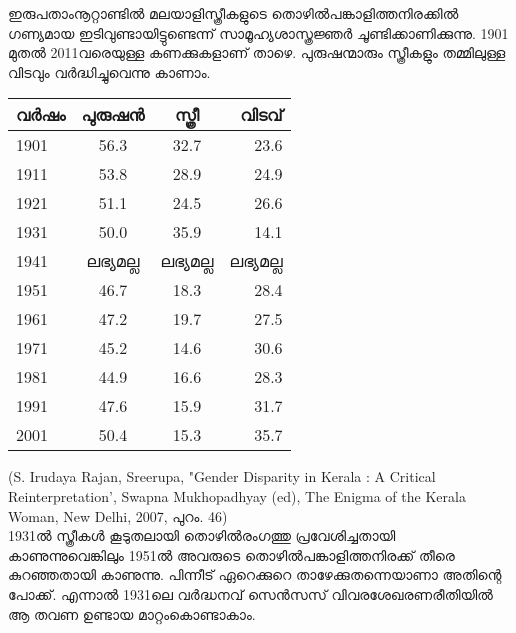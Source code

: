 \label{ch4box1} %
\begin{tcolorbox}[%
 breakable, %
  arc=0mm, 
  left=1pt, right = 1pt, 
  boxrule=0mm,
  colback = {blue!10}, %
] 
ഇരുപതാംനൂറ്റാണ്ടിൽ മലയാളിസ്ത്രീകളുടെ തൊഴിൽപങ്കാളിത്തനിരക്കിൽ ഗണ്യമായ ഇടിവുണ്ടായിട്ടുണ്ടെന്ന് സാമൂഹ്യശാസ്ത്രജ്ഞർ ചൂണ്ടിക്കാണിക്കുന്നു. 1901 മുതൽ 2011വരെയുള്ള കണക്കുകളാണ് താഴെ. പുരുഷന്മാരും സ്ത്രീകളും തമ്മിലുള്ള വിടവും വർദ്ധിച്ചുവെന്നു കാണാം. 

\begin{tabular}{ l c c r }
വർഷം &	പുരുഷൻ	& സ്ത്രീ &	വിടവ് \\
\hline
1901 &	56.3	&  32.7&	23.6\\
1911	& 53.8	& 28.9	& 24.9\\
1921&	51.1&	24.5&	26.6\\
1931	&50.0&	35.9&	14.1\\
1941&	ലഭ്യമല്ല&	ലഭ്യമല്ല	&ലഭ്യമല്ല\\
1951&	46.7&	18.3	&28.4\\
1961	&47.2	&19.7&	27.5\\
1971&	45.2	&14.6&	30.6\\
1981&	44.9&	16.6&	28.3\\
1991&	47.6&	15.9&	31.7\\
2001&	50.4	&15.3&	35.7\\
\end{tabular}

(S. Irudaya Rajan, Sreerupa, "Gender Disparity in Kerala : A Critical Reinterpretation', Swapna Mukhopadhyay (ed), The Enigma of the Kerala Woman, New Delhi, 2007, പുറം. 46)
\\
1931ൽ സ്ത്രീകൾ കൂടുതലായി തൊഴിൽരംഗത്തു പ്രവേശിച്ചതായി കാണുന്നുവെങ്കിലും 1951ൽ അവരുടെ തൊഴിൽപങ്കാളിത്തനിരക്ക് തീരെ കുറഞ്ഞതായി കാണുന്നു. പിന്നീട് ഏറെക്കുറെ താഴേക്കുതന്നെയാണാ അതിന്റെ പോക്ക്. എന്നാൽ 1931ലെ വർദ്ധനവ് സെൻസസ് വിവരശേഖരണരീതിയിൽ ആ തവണ ഉണ്ടായ മാറ്റംകൊണ്ടാകാം.
\end{tcolorbox}


